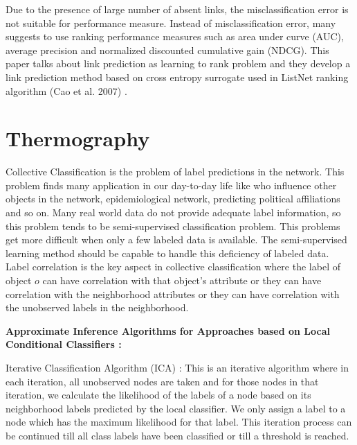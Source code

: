 Due to the presence of large number of absent links, the misclassification error is not suitable for performance measure. Instead of misclassification error, many suggests to use ranking performance measures such as area under curve (AUC), average precision and normalized discounted cumulative gain (NDCG). This paper talks about link prediction as learning to
rank problem and they develop a link prediction method based on cross entropy surrogate used in ListNet ranking algorithm (Cao et al. 2007) \cite{listnet}.

\section{\textbf{Thermography}}

\indent Collective Classification is the problem of label predictions in the network. This problem finds many application in our day-to-day life like who influence other objects in the network, epidemiological network, predicting political affiliations and so on. Many real world data do not provide adequate label information, so this problem tends to be semi-supervised classification problem. This problems get more difficult when only a few labeled data is available. The semi-supervised learning method should be capable to handle this deficiency of labeled data. Label correlation is the key aspect in collective classification where the label of object $o$ can have correlation with that object's attribute or they can have correlation with the neighborhood attributes or they can have correlation with the unobserved labels in the neighborhood.
\begin{flushleft}
\textbf{Approximate Inference Algorithms for Approaches based on Local Conditional Classifiers :}
\end{flushleft}


Iterative Classification Algorithm (ICA) : This is an iterative algorithm where in each iteration, all unobserved nodes are taken and for those nodes in that iteration, we calculate the likelihood of the labels of a node based on its neighborhood labels predicted by the local classifier. We only assign a label to a node which has the maximum likelihood for that label. This iteration process can be continued till all class labels have been classified or till a threshold is reached.

